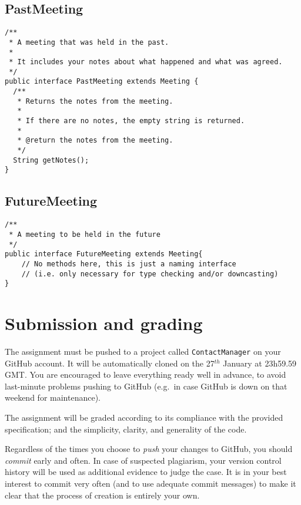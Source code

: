 \documentclass{article}
\begin{document}
\subsection{PastMeeting}
\label{sec:pastmeeting}

\begin{verbatim}
/**
 * A meeting that was held in the past. 
 *
 * It includes your notes about what happened and what was agreed.
 */
public interface PastMeeting extends Meeting {
  /**
   * Returns the notes from the meeting. 
   * 
   * If there are no notes, the empty string is returned. 
   * 
   * @return the notes from the meeting. 
   */
  String getNotes();
}
\end{verbatim}

\subsection{FutureMeeting}
\label{sec:futuremeeting}

\begin{verbatim}
/**
 * A meeting to be held in the future
 */
public interface FutureMeeting extends Meeting{
    // No methods here, this is just a naming interface
    // (i.e. only necessary for type checking and/or downcasting)
}
\end{verbatim}



\section{Submission and grading}
\label{sec:submission-grading}

The assignment must be pushed to a project called
\verb+ContactManager+ on your GitHub account. It will be automatically
cloned on the 27$^{th}$ January at 23h59.59 GMT. You are encouraged to
leave everything ready well in advance, to avoid last-minute problems
pushing to GitHub (e.g.~in case GitHub is down on that weekend for
maintenance).

The assignment will be graded according to its compliance with the
provided specification; and the simplicity, clarity, and generality of
the code.

Regardless of the times you choose to \emph{push} your changes to
GitHub, you should \emph{commit} early and often. In case of suspected
plagiarism, your version control history will be used as additional
evidence to judge the case. It is in your best interest to commit very
often (and to use adequate commit messages) to make it clear that the
process of creation is entirely your own.
\end{document}
